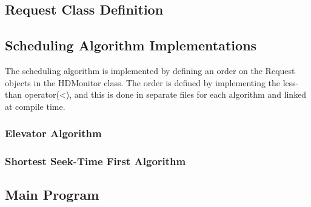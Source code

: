 \documentclass{report}
\begin{document}
\subsection{Request Class Definition}

\subsection{Scheduling Algorithm Implementations}
The scheduling algorithm is implemented by defining an order on the Request objects in the
HDMonitor class. The order is defined by implementing the less-than operator(<), and this
is done in separate files for each algorithm and linked at compile time.
\subsubsection{Elevator Algorithm}

\subsubsection{Shortest Seek-Time First Algorithm}

\subsection{Main Program}



\tableofcontents %
\end{document}
